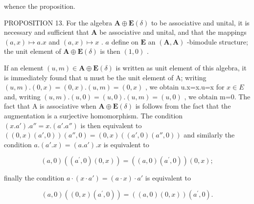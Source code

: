 whence the proposition.

PROPOSITION 13. For the algebra \(\mathbf{A} \oplus \mathbf{E}(\delta)\) to be associative and unital, it is necessary and sufficient that \(\mathbf{A}\) be associative and unital, and that the mappings \((a, x) \mapsto a.x\) and \((a, x) \mapsto x\) . \(a\) define on \(\mathbf{E}\) an \((\mathbf{A}, \mathbf{A})\) -bimodule structure; the unit element of \(\mathbf{A} \oplus \mathbf{E}(\delta)\) is then \((1, 0)\) .

If an element \((u,m)\in\mathbf{A}\oplus\mathbf{E}(\delta)\) is written as unit element of this algebra, it is immediately found that u must be the unit element of A; writing \((u,m).(0,x)=(0,x).(u,m)=(0,x)\) , we obtain u.x=x.u=x for \(x\in E\) and, writing \((u,m).(u,0)=(u,0).(u,m)=(u,0)\) , we obtain m=0. The fact that A is associative when \(\mathbf{A}\oplus\mathbf{E}(\delta)\) is follows from the fact that the augmentation is a surjective homomorphism. The condition \((x.a') .a''=x.(a'.a'')\) is then equivalent to \(((0,x)(a',0))(a'',0)=(0,x)((a',0)(a'',0))\) and similarly the condition \(a.(a'.x)=(a.a').x\) is equivalent to

\[
(a, 0) ((a ^ {\prime}, 0) (0, x)) = ((a, 0) (a ^ {\prime}, 0)) (0, x);
\]

finally the condition \(a \cdot (x \cdot a') = (a \cdot x) \cdot a'\) is equivalent to

\[
(a, 0) ((0, x) (a ^ {\prime}, 0)) = ((a, 0) (0, x)) (a ^ {\prime}, 0).
\]

